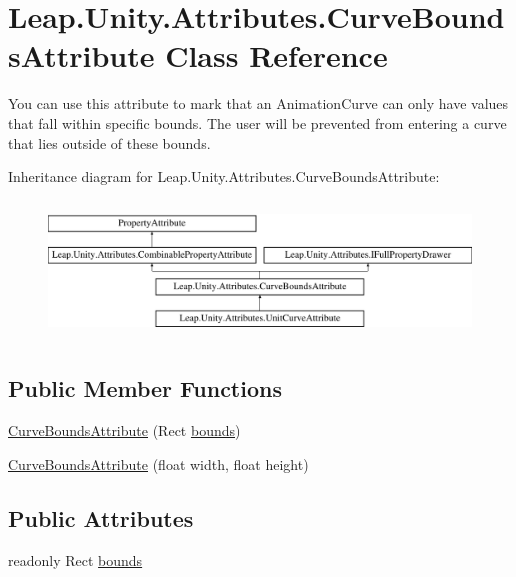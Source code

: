 \hypertarget{class_leap_1_1_unity_1_1_attributes_1_1_curve_bounds_attribute}{}\section{Leap.\+Unity.\+Attributes.\+Curve\+Bounds\+Attribute Class Reference}
\label{class_leap_1_1_unity_1_1_attributes_1_1_curve_bounds_attribute}


You can use this attribute to mark that an Animation\+Curve can only have values that fall within specific bounds. The user will be prevented from entering a curve that lies outside of these bounds.  


Inheritance diagram for Leap.\+Unity.\+Attributes.\+Curve\+Bounds\+Attribute\+:\begin{figure}[H]
\begin{center}
\leavevmode
\includegraphics[height=3.696370cm]{class_leap_1_1_unity_1_1_attributes_1_1_curve_bounds_attribute}
\end{center}
\end{figure}
\subsection*{Public Member Functions}
\begin{DoxyCompactItemize}
\item 
\mbox{\hyperlink{class_leap_1_1_unity_1_1_attributes_1_1_curve_bounds_attribute_a282d5c0e4993e943d40952569281fa85}{Curve\+Bounds\+Attribute}} (Rect \mbox{\hyperlink{class_leap_1_1_unity_1_1_attributes_1_1_curve_bounds_attribute_a5e454f6b0a0e4513ffb098ee9ab85a65}{bounds}})
\item 
\mbox{\hyperlink{class_leap_1_1_unity_1_1_attributes_1_1_curve_bounds_attribute_a4d51496341784854816dae3025b43974}{Curve\+Bounds\+Attribute}} (float width, float height)
\end{DoxyCompactItemize}
\subsection*{Public Attributes}
\begin{DoxyCompactItemize}
\item 
readonly Rect \mbox{\hyperlink{class_leap_1_1_unity_1_1_attributes_1_1_curve_bounds_attribute_a5e454f6b0a0e4513ffb098ee9ab85a65}{bounds}}
\end{DoxyCompactItemize}
